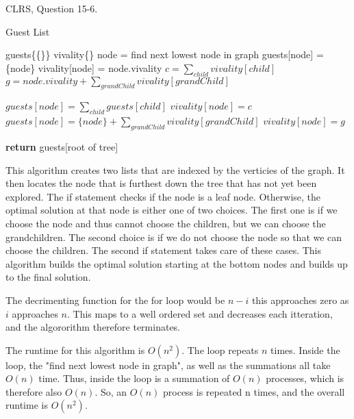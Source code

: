 \documentclass{article}
\begin{document}
\nextprob
CLRS, Question 15-6.

\begin{algorithm}
    \caption{Guest List}\label{guests}
    \begin{algorithmic}[1]
        \State guests\{\{\}\}
        \State vivality\{\}
			\State node = find next lowest node in graph
				\State guests[node] = \{node\}
				\State vivality[node] = node.vivality
			\Else
				\State $c = \sum_{child} vivality[child]$
				\State $g = node.vivality + \sum_{grandChild} vivality[grandChild]$

					\State $guests[node] = \sum_{child} guests[child]$
					\State $vivality[node] = c$
				\Else
					\State $guests[node] = \{node\} + \sum_{grandChild} vivality[grandChild]$
					\State $vivality[node] = g$
				\EndIf
			\EndIf
		\EndFor

       \State \textbf{return} guests[root of tree]

    \EndFunction
    \end{algorithmic}
\end{algorithm}

This algorithm creates two lists that are indexed by the verticies of the graph. It then locates the node that is furthest down the tree that has not yet been explored. The if statement checks if the node is a leaf node. Otherwise, the optimal solution at that node is either one of two choices. The first one is if we choose the node and thus cannot choose the children, but we can choose the grandchildren. The second choice is if we do not choose the node so that we can choose the children. The second if statement takes care of these cases. This algorithm builds the optimal solution starting at the bottom nodes and builds up to the final solution.

The decrimenting function for the for loop would be $n - i$ this approaches zero as $i$
 approaches $n$. This maps to a well ordered set and decreases each itteration, and the algororithm therefore terminates.
 
 The runtime for this algorithm is $O(n^2)$. The loop repeats $n$ times. Inside the loop, the "find next lowest node in graph", as well as the summations all take $O(n)$ time. Thus, inside the loop is a summation of $O(n)$ processes, which is therefore also $O(n)$. So, an $O(n)$ process is repeated n times, and the overall runtime is $O(n^2)$.
 
\end{document}
